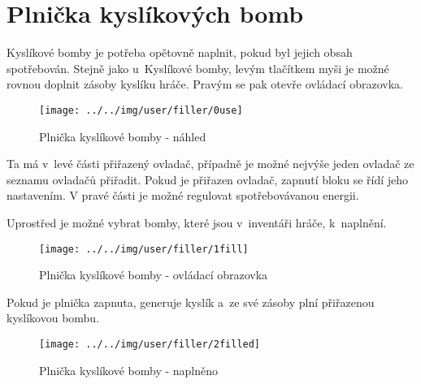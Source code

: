 
\section{Plnička kyslíkových bomb}

Kyslíkové bomby je potřeba opětovně naplnit, pokud byl jejich obsah spotřebován. Stejně jako u~Kyslíkové bomby, levým tlačítkem myši je možné rovnou doplnit zásoby kyslíku hráče. Pravým se pak otevře ovládací obrazovka.

\begin{figure}[!ht]\centering
\texttt{[image: ../../img/user/filler/0use]}

\caption{Plnička kyslíkové bomby - náhled}
\label{fig:user_filler_0use}

\end{figure}

\FloatBarrier

Ta má v~levé části přiřazený ovladač, případně je možné nejvýše jeden ovladač ze seznamu ovladačů přiřadit. Pokud je přiřazen ovladač, zapnutí bloku se řídí jeho nastavením. V pravé části je možné regulovat spotřebovávanou energii.

Uprostřed je možné vybrat bomby, které jsou v~inventáři hráče, k~naplnění.

\begin{figure}[!ht]\centering
\texttt{[image: ../../img/user/filler/1fill]}

\caption{Plnička kyslíkové bomby - ovládací obrazovka}
\label{fig:user_filler_1fill}

\end{figure}

\FloatBarrier

Pokud je plnička zapnuta, generuje kyslík a~ze své zásoby plní přiřazenou kyslíkovou bombu.

\begin{figure}[!ht]\centering
\texttt{[image: ../../img/user/filler/2filled]}

\caption{Plnička kyslíkové bomby - naplněno}
\label{fig:user_filler_2filled}

\end{figure}



\FloatBarrier